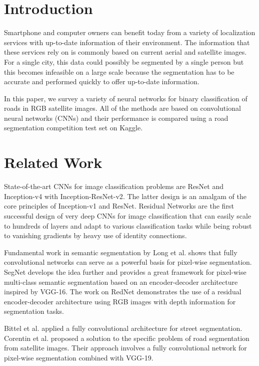 \documentclass[10pt,conference,compsocconf]{IEEEtran}
\begin{document}
\section{Introduction}
\label{sec:introduction}
Smartphone and computer owners can benefit today from a variety of localization services with up-to-date information of their environment. The information that these services rely on is commonly based on current aerial and satellite images. For a single city, this data could possibly be segmented by a single person but this becomes infeasible on a large scale because the segmentation has to be accurate and performed quickly to offer up-to-date information.

In this paper, we survey a variety of neural networks for binary classification of roads in RGB satellite images. All of the methods are based on convolutional neural networks (CNNs) and their performance is compared using a road segmentation competition test set on Kaggle\cite{url:kaggle}.

\section{Related Work}
\label{sec:related-work}
State-of-the-art CNNs for image classification problems are ResNet\cite{he2016deep} and Inception-v4 with Inception-ResNet-v2\cite{szegedy2017inception}. The latter design is an amalgam of the core principles of Inception-v1 and ResNet. Residual Networks are the first successful design of very deep CNNs for image classification that can easily scale to hundreds of layers and adapt to various classification tasks while being robust to vanishing gradients by heavy use of identity connections.

Fundamental work in semantic segmentation by Long et al.\cite{long2015fully} shows that fully convolutional networks can serve as a powerful basis for pixel-wise segmentation. SegNet\cite{badrinarayanan2015segnet} develops the idea further and provides a great framework for pixel-wise multi-class semantic segmentation based on an encoder-decoder architecture inspired by VGG-16\cite{simonyan2014very}. The work on RedNet\cite{jiang2018rednet} demonstrates the use of a residual encoder-decoder architecture using RGB images with depth information for segmentation tasks.

Bittel et al.\cite{bittel2015pixel} applied a fully convolutional architecture for street segmentation. Corentin et al.\cite{henry2018road} proposed a solution to the specific problem of road segmentation from satellite images. Their approach involves a fully convolutional network for pixel-wise segmentation combined with VGG-19\cite{simonyan2014very}.
\end{document}
